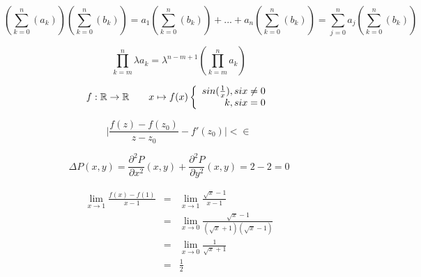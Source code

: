 \documentclass[a4paper,12pt]{report}
\begin{document}
	
		\begin{equation}
		   (\sum_{k=0}^{n}(a_{k}))(\sum_{k=0}^{n}(b_{k}))=a_{1}(\sum_{k=0}^{n}(b_{k}))+...+a_{n}(\sum_{k=0}^{n}(b_{k})) =\sum_{j=0}^{n}a_{j}(\sum_{k=0}^{n}(b_{k}))
		\end{equation}
	
		\begin{equation}
			    \prod_{k=m}^{n}\lambda a_{k} = \lambda^{n - m+1}(\prod_{k=m}^{n}a_{k})
			\end{equation}
	
	
	\begin{equation}
		f :\mathbb{R} \to \mathbb{R}  \\
		\quad \quad  x \mapsto f(x)\left \{
		\begin{array}{r c l}
			sin(\frac{1}{x}), si x \neq 0 \\
			k ,  si x =0\\
		\end{array}
		\right .
	\end{equation}
	
	\begin{equation}
		\lvert\frac{f(z) -f(z_{0})}{z - z_{0}}-f'(z_{0})\rvert < \in
	\end{equation}
	
		\begin{equation}
		    \Delta P(x,y) = \frac{\partial^{2} P}{\partial x^{2}}(x,y) +\frac{\partial^{2} P}{\partial y^{2}}(x,y) = 2 - 2= 0
		\end{equation}
	
		\begin{eqnarray}
			    \lim_{x \to 1}  \frac {f(x)-f(1)}{x- 1} & = & \lim_{x \to 1} \frac {\sqrt{x}- 1}{x- 1} \\
		    & = & \lim_{x \to 0} \frac {\sqrt{x}- 1}{(\sqrt{x}+ 1)(\sqrt{x}- 1)} \\
			    & = & \lim_{x \to 0}\frac {1}{\sqrt{x}+ 1} \\
		    & = & \frac{1}{2} \\
		\end{eqnarray}
	
	
	
\end{document}
